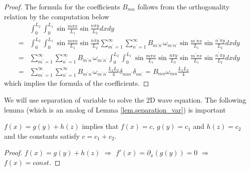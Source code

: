 \begin{proof}
The formula for the coefficients $B_{mn}$ follows from the orthogonality relation by the computation below
$$
\begin{aligned}
& \int_0^{L_2} \int_0^{L_1} \sin \frac{m \pi x}{L_1} \sin \frac{n \pi y}{L_2} d x d y \\
= & \int_0^{L_2} \int_0^{L_1} \sin \frac{m \pi x}{L_1} \sin \frac{n \pi y}{L_2} \sum_{m^{\prime}=1}^{\infty} \sum_{n^{\prime}=1}^{\infty} B_{m^{\prime} n^{\prime}} \omega_{m^{\prime} n^{\prime}} \sin \frac{m^{\prime} \pi x}{L_1} \sin \frac{n^{\prime} \pi y}{L_2} d x d y \\
= & \sum_{m^{\prime}=1}^{\infty} \sum_{n^{\prime}=1}^{\infty} B_{m^{\prime} n^{\prime}} \omega_{m^{\prime} n^{\prime}} \int_0^{L_2} \int_0^{L_1} \sin \frac{m \pi x}{L_1} \sin \frac{n \pi y}{L_2} \sin \frac{m^{\prime} \pi x}{L_1} \sin \frac{n^{\prime} \pi y}{L_2} d x d y \\
= & \sum_{m^{\prime}=1}^{\infty} \sum_{n^{\prime}=1}^{\infty} B_{m^{\prime} n^{\prime}} \omega_{m^{\prime} n^{\prime}} \frac{L_1 L_2}{4} \delta_{m m^{\prime}} \delta_{n n^{\prime}}=B_{m n} \omega_{m n} \frac{L_1 L_2}{4}
\end{aligned}
$$
which implies the formula of the coefficients.
\end{proof}

We will use separation of variable to solve the 2D wave equation. The following lemma (which is an analog of Lemma \ref{lem.separation_var}) is important
\begin{lemma}[]\label{lem.separation_var_2D}
    $f(x) = g(y) + h(z)$ implies that $f(x) = c$, $g(y) = c_1$ and $h(z) = c_2$ and the constants satisfy $c = c_1 + c_2$.
\end{lemma}
\begin{proof}
    $f(x) = g(y) + h(z)$ $\Rightarrow$ $f'(x) = \partial_x (g(y)) = 0$ $\Rightarrow$ $f(x) = \textit{const}$.
\end{proof}

